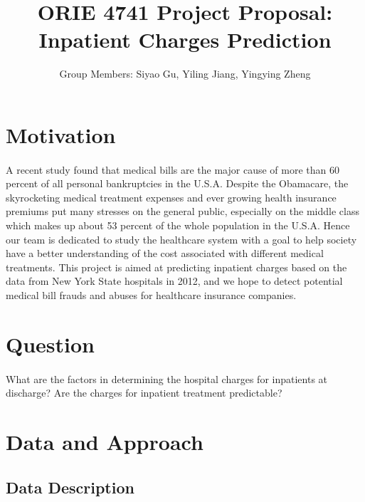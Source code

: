 \documentclass[9pt]{article}
\title{ORIE 4741 Project Proposal: Inpatient Charges Prediction}
\author{Group Members: Siyao Gu, Yiling Jiang, Yingying Zheng}
\begin{document}
\maketitle
 
\section{Motivation}
 
\paragraph{}

A recent study found that medical bills are the major cause of more than 60 percent of all personal bankruptcies in the U.S.A. Despite the Obamacare, the skyrocketing medical treatment expenses and ever growing health insurance premiums put many stresses on the general public, especially on the middle class which makes up about 53 percent of the whole population in the U.S.A. Hence our team is dedicated to study the healthcare system with a goal to help society have a better understanding of the cost associated with different medical treatments. This project is aimed at predicting inpatient charges based on the data from New York State hospitals in 2012, and we hope to detect potential medical bill frauds and abuses for healthcare insurance companies.

\section{Question}
 
\paragraph{} 
 
What are the factors in determining the hospital charges for inpatients at discharge? Are the charges for inpatient treatment predictable?

\section{Data and Approach}

\subsection{Data Description}

\paragraph{}
\end{document}
